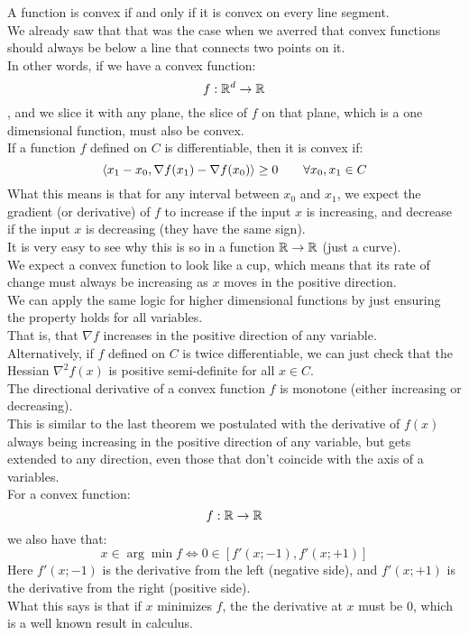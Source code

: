 \documentclass[12pt]{article}
\begin{document}
A function is convex if and only if it is
convex on every line segment. \\
We already saw that that was the case
when we averred that convex functions
should always be below a line
that connects two points on it. \\
In other words, if we have a convex function:
\[ f: \mathbb{R}^d \to \mathbb{R} \],
and we slice it with any plane,
the slice of $f$ on that plane,
which is a one dimensional function,
must also be convex. \\

If a function $f$ defined on $C$ is
differentiable,
then it is convex if:
\[ \left\langle x_1 - x_0, 
\nabla f(x_1) - \nabla f(x_0) \right\rangle \geq 0 \qquad
\forall x_0, x_1 \in C \]
What this means is that for any interval
between $x_0$ and $x_1$,
we expect the gradient (or derivative)
of $f$ to increase if the input $x$
is increasing,
and decrease if the input $x$ is decreasing
(they have the same sign). \\
It is very easy to see why this is so
in a function $\mathbb{R} \to \mathbb{R}$
(just a curve). \\
We expect a convex function to look like a cup,
which means that its rate of change must
always be increasing as $x$ moves in the
positive direction. \\
We can apply the same logic for higher
dimensional functions
by just ensuring the property holds
for all variables. \\
That is, that $\nabla f$
increases in the positive direction
of any variable. \\

Alternatively,
if $f$ defined on $C$ is twice differentiable,
we can just check that the Hessian
$\nabla^2 f(x)$ is positive semi-definite
for all $x \in C$. \\

The directional derivative of a convex
function $f$ is monotone (either increasing
or decreasing). \\
This is similar to the last theorem
we postulated with the derivative of $f(x)$
always being increasing in the positive
direction of any variable,
but gets extended to any direction,
even those that don't coincide
with the axis of a variables. \\

For a convex function:
\[ f:\mathbb{R} \to \mathbb{R} \]
we also have that:
\[ x \in \arg \min f \iff 
0 \in [f'(x; -1), f'(x; +1)] \]
Here $f'(x; -1)$ is the derivative from
the left (negative side),
and $f'(x; +1)$ is the derivative
from the right (positive side). \\
What this says is that if $x$ minimizes $f$,
the the derivative at $x$
must be $0$,
which is a well known result in calculus. \\
\end{document}

